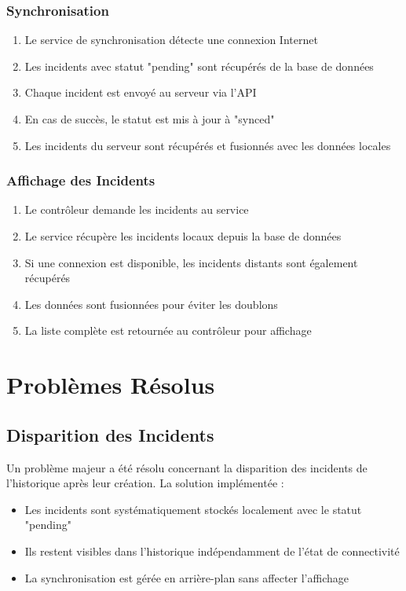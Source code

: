 \documentclass[12pt,a4paper]{article}
\begin{document}
\subsubsection{Synchronisation}
\begin{enumerate}
    \item Le service de synchronisation détecte une connexion Internet
    \item Les incidents avec statut "pending" sont récupérés de la base de données
    \item Chaque incident est envoyé au serveur via l'API
    \item En cas de succès, le statut est mis à jour à "synced"
    \item Les incidents du serveur sont récupérés et fusionnés avec les données locales
\end{enumerate}

\subsubsection{Affichage des Incidents}
\begin{enumerate}
    \item Le contrôleur demande les incidents au service
    \item Le service récupère les incidents locaux depuis la base de données
    \item Si une connexion est disponible, les incidents distants sont également récupérés
    \item Les données sont fusionnées pour éviter les doublons
    \item La liste complète est retournée au contrôleur pour affichage
\end{enumerate}

\section{Problèmes Résolus}

\subsection{Disparition des Incidents}
Un problème majeur a été résolu concernant la disparition des incidents de l'historique après leur création. La solution implémentée :
\begin{itemize}
    \item Les incidents sont systématiquement stockés localement avec le statut "pending"
    \item Ils restent visibles dans l'historique indépendamment de l'état de connectivité
    \item La synchronisation est gérée en arrière-plan sans affecter l'affichage
\end{itemize}
\end{document}
